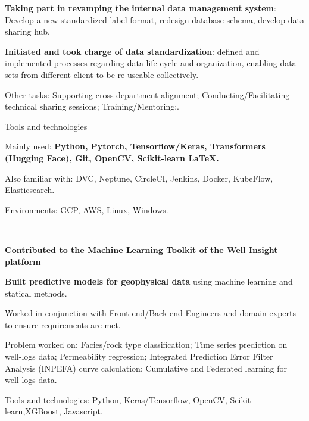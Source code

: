\begin{xitemize}
\begin{zitemize}
        \item \textbf{Taking part in revamping the internal data management system}: Develop a new standardized label format, redesign database schema, develop data sharing hub.
        \item \textbf{Initiated and took charge of data standardization}: defined and implemented processes regarding data life cycle and organization, enabling data sets from different client to be re-useable collectively.
    \end{zitemize}
    \item Other tasks: Supporting cross-department alignment; Conducting/Facilitating technical sharing sessions; Training/Mentoring;.
    \item Tools and technologies
    \begin{zitemize}
        \item Mainly used: \textbf{Python, Pytorch, Tensorflow/Keras, Transformers (Hugging Face), Git, OpenCV, Scikit-learn \LaTeX.}
        \item Also familiar with: DVC, Neptune, CircleCI, Jenkins, Docker, KubeFlow, Elasticsearch.
        \item Environments: GCP, AWS, Linux, Windows.
    \end{zitemize}
\end{xitemize}

\\
\vspace{-.2em}
\begin{xitemize}
    \item \textbf{Contributed to the Machine Learning Toolkit of the \href{https://www.i2g.cloud/well-insight}{Well Insight platform \faUpRightFromSquare}}
    \begin{zitemize}
        \item \textbf{Built predictive models for geophysical data} using machine learning and statical methods.
        \item Worked in conjunction with Front-end/Back-end Engineers and domain experts to ensure requirements are met.
        \item Problem worked on: Facies/rock type classification; Time series prediction on well-logs data; Permeability regression; Integrated Prediction Error Filter Analysis (INPEFA) curve calculation; Cumulative and Federated learning for well-logs data.
    \end{zitemize}
    \item Tools and technologies: Python, Keras/Tensorflow, OpenCV, Scikit-learn,XGBoost, Javascript.
\end{xitemize}


